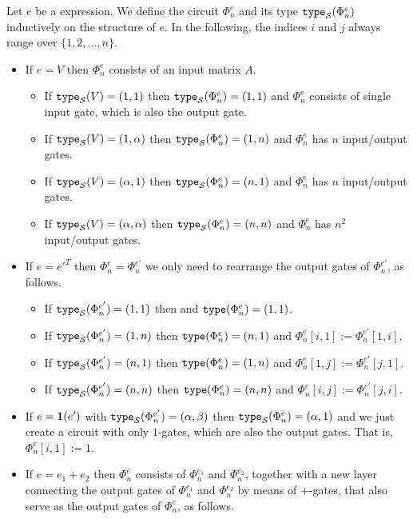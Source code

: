 Let $e$ be a \langfor expression. We define the circuit $\Phi_n^e$ and its type $\texttt{type}_{\mathcal{S}}(\Phi_n^e)$ inductively on the structure of $e$.
In the following, the indices $i$ and $j$ always range over $\{1,2,\ldots,n\}$.
\begin{itemize}
	\item
	If $e=V$ then $\Phi_n^e$ consists of an input matrix $A$.
\begin{itemize}
	\item If $\texttt{type}_{\mathcal{S}}(V)=(1,1)$ then $\texttt{type}_{\mathcal{S}}(\Phi^e_n)=(1,1)$ and $\Phi_n^e$ consists of single input gate, which is also
	the output gate.
	\item If $\texttt{type}_{\mathcal{S}}(V)=(1,\alpha)$ then $\texttt{type}_{\mathcal{S}}(\Phi^e_n)=(1,n)$ and $\Phi^e_n$ has $n$ input/output gates.
  \item If $\texttt{type}_{\mathcal{S}}(V)=(\alpha,1)$ then $\texttt{type}_{\mathcal{S}}(\Phi^e_n)=(n,1)$ and $\Phi^e_n$ has $n$ input/output gates.
	\item If $\texttt{type}_{\mathcal{S}}(V)=(\alpha,\alpha)$ then $\texttt{type}_{\mathcal{S}}(\Phi^e_n)=(n,n)$ and $\Phi^e_n$ has $n^2$ input/output gates. 
\end{itemize}
\item
If $e=e'^T$ then $\Phi^e_n=\Phi^{e'}_n$ we only need to rearrange the output gates of $\Phi_n^{e'}$, as follows.
\begin{itemize}
	\item If $\texttt{type}_{\mathcal{S}}(\Phi^{e'}_n)=(1, 1)$ then and $\texttt{type}(\Phi^e_n)=(1,1)$.
	\item If $\texttt{type}_{\mathcal{S}}(\Phi^{e'}_n)=(1, n)$ then $\texttt{type}(\Phi^e_n)=(n,1)$ and $\Phi^e_n[i,1]:=\Phi^{e'}_n[1,i]$. 
  \item If $\texttt{type}_{\mathcal{S}}(\Phi^{e'}_n)=(n, 1)$ then $\texttt{type}(\Phi^e_n)=(1,n)$ and $\Phi^e_n[1,j]:=\Phi^{e'}_n[j,1]$. 
  \item If $\texttt{type}_{\mathcal{S}}(\Phi^{e'}_n)=(n, n)$ then $\texttt{type}(\Phi^e_n)=(n,n)$ and $\Phi^e_n[i,j]:=\Phi^{e'}_n[j,i]$. 
\end{itemize}
\item
If $e={\mathbf{1}}(e')$ with $\texttt{type}_{\mathcal{S}}(\Phi^{e'}_n)=(\alpha,\beta)$ then $\texttt{type}_{\mathcal{S}}(\Phi^{e}_n)=(\alpha,1)$ and we just
create a circuit with only $1$-gates, which are also the output gates. That is,
$\Phi^e_n[i,1]:=1$.
\item
If $e=e_1 + e_2$ then $\Phi_n^e$ consists of $\Phi_n^{e_1}$ and $\Phi_n^{e_2}$, together with  a new layer connecting the output gates of $\Phi_n^{e_1}$ and $\Phi_n^{e_2}$ by means
of $+$-gates, that also serve as the output gates of $\Phi_n^e$, as follows.
\begin{itemize}

\end{itemize}
\end{itemize}
